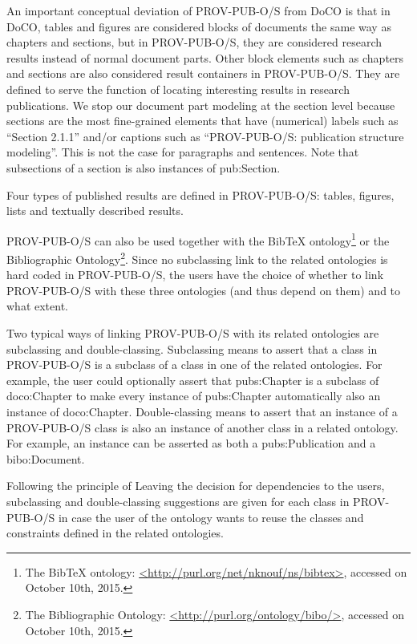An important conceptual deviation of PROV-PUB-O/S from DoCO is that in DoCO, tables and figures are considered blocks of documents the same way as chapters and sections, but in PROV-PUB-O/S, they are considered research results instead of normal document parts. Other block elements such as chapters and sections are also considered result containers in PROV-PUB-O/S. They are defined to serve the function of locating interesting results in research publications. We stop our document part modeling at the section level because sections are the most fine-grained elements that have (numerical) labels such as ``Section 2.1.1'' and/or captions such as ``PROV-PUB-O/S: publication structure modeling''. This is not the case for paragraphs and sentences. Note that subsections of a section is also instances of pub:Section. 

Four types of published results are defined in PROV-PUB-O/S: tables, figures, lists and textually described results. 

PROV-PUB-O/S can also be used together with the BibTeX ontology\footnote{The BibTeX ontology: \url{<http://purl.org/net/nknouf/ns/bibtex>}, accessed on October 10th, 2015.} or the Bibliographic Ontology\footnote{The Bibliographic Ontology: \url{<http://purl.org/ontology/bibo/>}, accessed on October 10th, 2015.}. Since no subclassing link to the related ontologies is hard coded in PROV-PUB-O/S, the users have the choice of whether 
to link PROV-PUB-O/S with these three ontologies (and thus depend on them) and to what extent. 

Two typical ways of linking PROV-PUB-O/S with its related ontologies are subclassing and double-classing. Subclassing means to assert that a class in PROV-PUB-O/S is a subclass of 
a class in one of the related ontologies. For example, the user could optionally assert that pubs:Chapter is a subclass of 
doco:Chapter to make every instance of pubs:Chapter automatically also an instance of doco:Chapter. Double-classing means to assert that an instance of 
a PROV-PUB-O/S class is also an instance of another class in a related ontology. For example, an instance can be asserted as both a pubs:Publication 
and a bibo:Document.

Following the principle of Leaving the decision for dependencies to the users, subclassing and double-classing suggestions are given for each class in PROV-PUB-O/S 
in case the user of the ontology 
wants to reuse the classes and constraints defined in the related ontologies.

